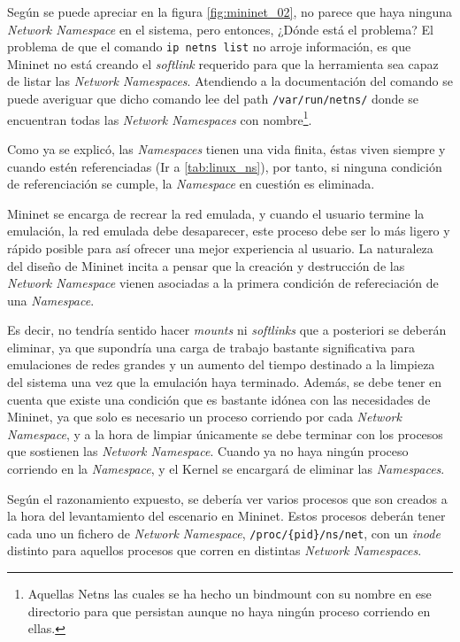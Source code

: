 Según se puede apreciar en la figura \ref{fig:mininet_02}, no parece que haya ninguna \textit{Network Namespace} en el sistema, pero entonces, ¿Dónde está el problema? El problema de que el comando \texttt{ip netns list} no arroje información, es que Mininet no está creando el \textit{softlink} requerido para que la herramienta sea capaz de listar las \textit{Network Namespaces}. Atendiendo a la documentación del comando se puede averiguar que dicho comando lee del path \texttt{/var/run/netns/} donde se encuentran todas las \textit{Network Namespaces} con nombre\footnote{Aquellas Netns las cuales se ha hecho un bindmount con su nombre en ese directorio para que persistan aunque no haya ningún proceso corriendo en ellas.}.\\
\par
Como ya se explicó, las \textit{Namespaces} tienen una vida finita, éstas viven siempre y cuando estén referenciadas (Ir a \ref{tab:linux_ns}), por tanto, si ninguna condición de referenciación se cumple, la \textit{Namespace} en cuestión es eliminada.\\
\par
Mininet se encarga de recrear la red emulada, y cuando el usuario termine la emulación, la red emulada debe desaparecer, este proceso debe ser lo más ligero y rápido posible para así ofrecer una mejor experiencia al usuario. La naturaleza del diseño de Mininet incita a pensar que la creación y destrucción de las \textit{Network Namespace} vienen asociadas a la primera condición de refereciación de una \textit{Namespace}. \\
\par
Es decir, no tendría sentido hacer \textit{mounts} ni \textit{softlinks} que a posteriori se deberán eliminar, ya que supondría una carga de trabajo bastante significativa para emulaciones de redes grandes y un aumento del tiempo destinado a la limpieza del sistema una vez que la emulación haya terminado. Además, se debe tener en cuenta que existe una condición que es bastante idónea con las necesidades de Mininet, ya que solo es necesario un proceso corriendo por cada \textit{Network Namespace}, y a la hora de limpiar únicamente se debe terminar con los procesos que sostienen las \textit{Network Namespace}. Cuando ya no haya ningún proceso corriendo en la \textit{Namespace}, y el Kernel se encargará de eliminar las \textit{Namespaces}.\\
\par
Según el razonamiento expuesto, se debería ver varios procesos que son creados a la hora del levantamiento del escenario en Mininet. Estos procesos deberán tener cada uno un fichero de \textit{Network Namespace}, \texttt{/proc/\{pid\}/ns/net}, con un \textit{inode} distinto para aquellos procesos que corren en distintas \textit{Network Namespaces}.\\

